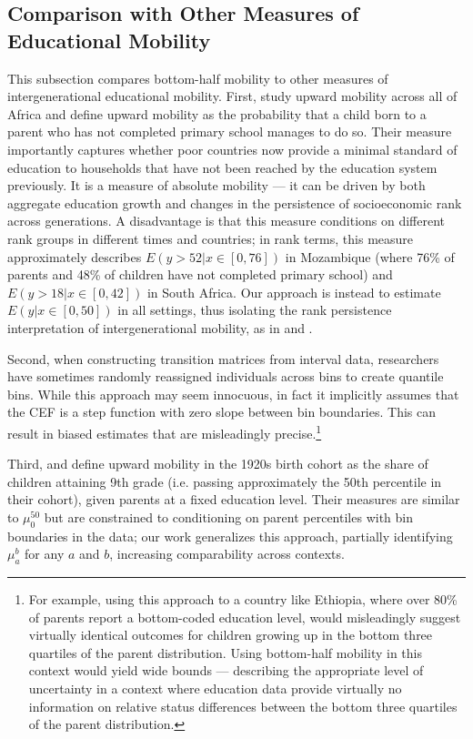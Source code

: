 \documentclass[12pt,letterpaper]{article}
\numberwithin{equation}{section}
\begin{document}
\subsection{Comparison with Other Measures of Educational Mobility}
\label{sec:comparison}

This subsection compares bottom-half mobility to other measures of intergenerational educational mobility. First,  study upward mobility across all of Africa and define upward mobility as the probability that a child born to a parent who has not completed primary school manages to do so. Their measure importantly captures whether poor countries now provide a minimal standard of education to households that have not been reached by the education system previously. It is a measure of absolute mobility --- it can be driven by both aggregate education growth and changes in the persistence of socioeconomic rank across generations. A disadvantage is that this measure conditions on different rank groups in different times and countries; in rank terms, this measure approximately describes $E(y > 52|x \in [0,76])$ in Mozambique (where 76\% of parents and 48\% of children have not completed primary school) and $E(y > 18|x \in [0,42])$ in South Africa. Our approach is instead to estimate $E(y|x \in [0, 50])$ in all settings, thus isolating the rank persistence interpretation of intergenerational mobility, as in  and .

Second, when constructing transition matrices from interval data, researchers have sometimes randomly reassigned individuals across bins to create quantile bins. While this approach may seem innocuous, in fact it implicitly assumes that the CEF is a step function with zero slope between bin boundaries. This can result in biased estimates that are misleadingly precise.\footnote{For example, using this approach to a country like Ethiopia, where over 80\% of parents report a bottom-coded education level, would misleadingly suggest virtually identical outcomes for children growing up in the bottom three quartiles of the parent distribution. Using bottom-half mobility in this context would yield wide bounds --- describing the appropriate level of uncertainty in a context where education data provide virtually no information on relative status differences between the bottom three quartiles of the parent distribution.}

Third,  and  define upward mobility in the 1920s birth cohort as the share of children attaining 9th grade (i.e. passing approximately the 50th percentile in their cohort), given parents at a fixed education level. Their measures are similar to $\mu_0^{50}$ but are constrained to conditioning on parent percentiles with bin boundaries in the data; our work generalizes this approach, partially identifying $\mu_a^b$ for any $a$ and $b$, increasing comparability across contexts.
\end{document}
